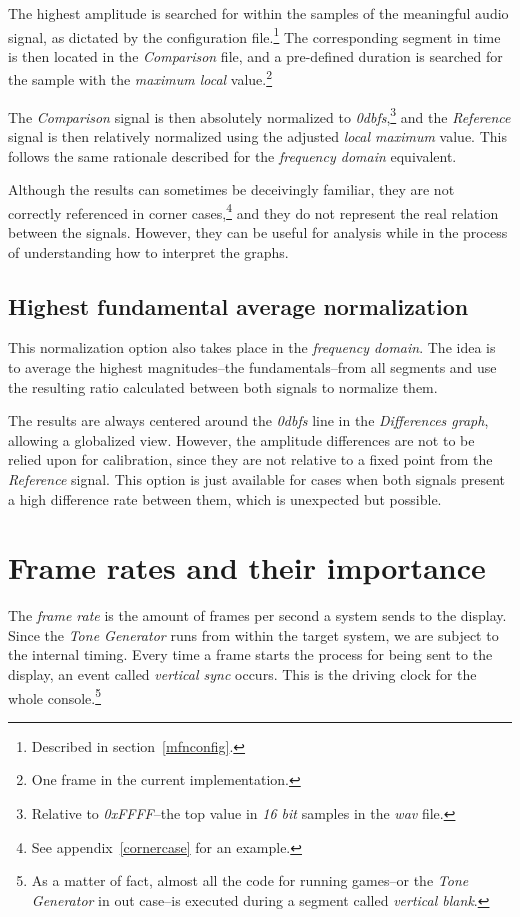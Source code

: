 \documentclass[10pt,a4paper]{report}
\newcommand{\ac}[1]{\textit{\mbox{\acrshort{#1}}}}
\newcommand{\db}[1]{\textit{\mbox{#1\acrshort{dbfs}}}}
\begin{document}
\begin{appendices}
The highest amplitude is searched for within the samples of the meaningful audio signal, as dictated by the configuration file.\footnote{Described in section~\ref{mfnconfig}.} The corresponding segment in time is then located in the \textit{Comparison} file, and a pre-defined duration is searched for the sample with the \textit{maximum local} value.\footnote{One frame in the current implementation.}

The \textit{Comparison} signal is then absolutely normalized to \db{0},\footnote{Relative to \textit{0xFFFF}--the top value in \textit{16 bit} samples in the \ac{wav} file.} and the \textit{Reference} signal is then relatively normalized using the adjusted \textit{local maximum} value. This follows the same rationale described for the \textit{frequency domain} equivalent.

Although the results can sometimes be deceivingly familiar, they are not correctly referenced in corner cases,\footnote{See appendix~\ref{cornercase} for an example.} and they do not represent the real relation between the signals. However, they can be useful for analysis while in the process of understanding how to interpret the graphs.

\section{Highest fundamental average normalization}

This normalization option also takes place in the \textit{frequency domain}. The idea is to average the highest magnitudes--the fundamentals--from all segments and use the resulting ratio calculated between both signals to normalize them.

The results are always centered around the \db{0} line in the \textit{Differences graph}, allowing a globalized view. However, the amplitude differences are not to be relied upon for calibration, since they are not relative to a fixed point from the \textit{Reference} signal. This option is just available for cases when both signals present a high difference rate between them, which is unexpected but possible.

\chapter{Frame rates and their importance}
\label{framerate}

The \textit{frame rate} is the amount of frames per second a system sends to the display. Since the \textit{Tone Generator} runs from within the target system, we are subject to the internal timing. Every time a frame starts the process for being sent to the display, an event called \textit{vertical sync} occurs. This is the driving clock for the whole console.\footnote{As a matter of fact, almost all the code for running games--or the \textit{Tone Generator} in out case--is executed during a segment called \textit{vertical blank}.}


\end{appendices}
\end{document}
